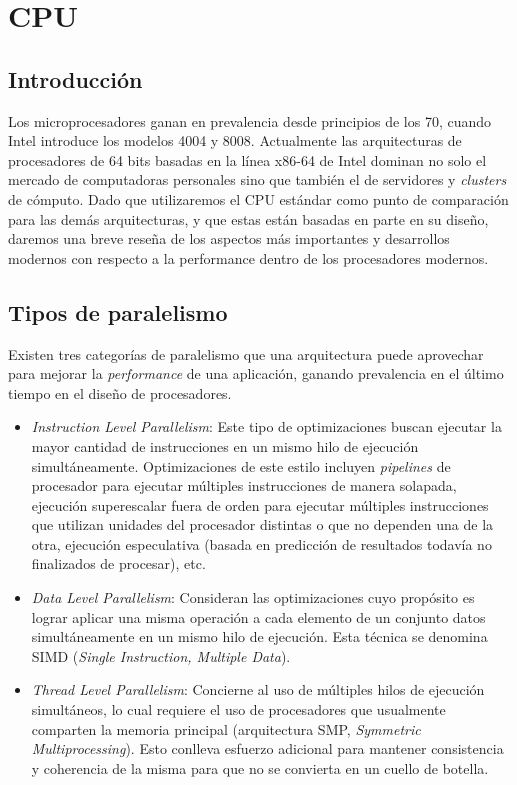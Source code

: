 \section {CPU}

\subsection{Introducci\'on}

Los microprocesadores ganan en prevalencia desde principios de los 70,
cuando Intel introduce los modelos 4004 y 8008. Actualmente las arquitecturas
de procesadores de 64 bits basadas en la l\'inea x86-64 de Intel
dominan no solo el mercado de computadoras personales sino que tambi\'en el de
servidores y \textit{clusters} de c\'omputo. Dado que utilizaremos el CPU
est\'andar como punto de comparaci\'on para las dem\'as arquitecturas, y que estas
est\'an basadas en parte en su dise\~no, daremos una breve rese\~na de los aspectos
m\'as importantes y desarrollos modernos con respecto a la performance dentro de
los procesadores modernos.


\subsection{Tipos de paralelismo}

Existen tres categor\'ias de paralelismo que una arquitectura puede aprovechar
para mejorar la \textit{performance} de una aplicaci\'on, ganando prevalencia
en el \'ultimo tiempo en el dise\~no de procesadores.

\begin{itemize}
    \item \textit{Instruction Level Parallelism}: Este tipo de optimizaciones buscan
    ejecutar la mayor cantidad de instrucciones en un mismo hilo de ejecuci\'on simult\'aneamente.
    Optimizaciones de este estilo incluyen
    \textit{pipelines} de procesador para ejecutar m\'ultiples instrucciones de manera solapada,
    ejecuci\'on superescalar fuera de orden para ejecutar m\'ultiples instrucciones que
    utilizan unidades del procesador distintas o que no dependen una de la otra, ejecuci\'on
    especulativa (basada en predicci\'on de resultados todav\'ia no finalizados de procesar), etc.

    \item \textit{Data Level Parallelism}: Consideran las optimizaciones cuyo prop\'osito es
    lograr aplicar una misma operaci\'on a cada elemento de un conjunto datos simult\'aneamente
    en un mismo hilo de ejecuci\'on. Esta t\'ecnica se denomina SIMD
    (\textit{Single Instruction, Multiple Data}).

    \item \textit{Thread Level Parallelism}: Concierne al uso de m\'ultiples hilos de ejecuci\'on
    simult\'aneos, lo cual requiere el uso de procesadores que usualmente
    comparten la memoria principal (arquitectura SMP, \textit{Symmetric Multiprocessing}).
    Esto conlleva esfuerzo adicional para mantener consistencia y coherencia de la misma
    para que no se convierta en un cuello de botella.
\end{itemize}

